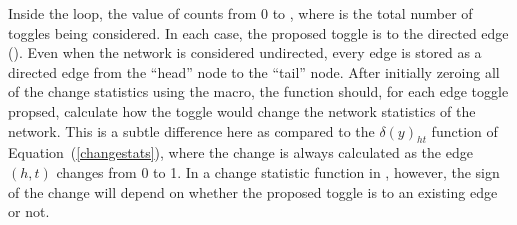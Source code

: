 \documentclass[article]{jss}
\begin{document}
Inside the  loop, the value of  
counts from 0 to , where  is the total number of
toggles being considered.  In each case, the proposed toggle is to the
directed edge ().  Even when the network is considered undirected,
every edge is stored as a directed edge from the ``head'' node to the ``tail'' node.  
After initially zeroing all of the change statistics using the
 macro, the function should, for each edge 
toggle propsed, calculate how the toggle would change the network statistics of the
network.  This is a subtle difference here as compared to  the $\delta(y)_{ht}$ function of 
Equation~(\ref{changestats}), where the change is always calculated as the edge $(h,t)$ 
changes from 0 to 1.  In a change statistic function in , however, the sign of the
change will depend on whether the proposed toggle is to an existing edge or not.
\end{document}
